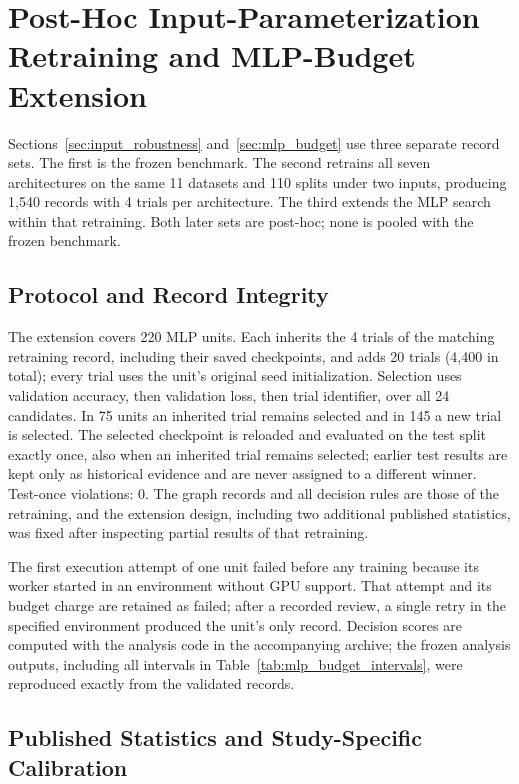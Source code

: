 \section{Post-Hoc Input-Parameterization Retraining and MLP-Budget Extension}
\label{app:mlp_budget}

Sections~\ref{sec:input_robustness} and~\ref{sec:mlp_budget} use three separate record sets. The first is the frozen benchmark. The second retrains all seven architectures on the same 11 datasets and 110 splits under two inputs, producing 1,540 records with 4 trials per architecture. The third extends the MLP search within that retraining. Both later sets are post-hoc; none is pooled with the frozen benchmark.

\subsection{Protocol and Record Integrity}

The extension covers 220 MLP units. Each inherits the 4 trials of the matching retraining record, including their saved checkpoints, and adds 20 trials (4,400 in total); every trial uses the unit's original seed initialization. Selection uses validation accuracy, then validation loss, then trial identifier, over all 24 candidates. In 75 units an inherited trial remains selected and in 145 a new trial is selected. The selected checkpoint is reloaded and evaluated on the test split exactly once, also when an inherited trial remains selected; earlier test results are kept only as historical evidence and are never assigned to a different winner. Test-once violations: 0. The graph records and all decision rules are those of the retraining, and the extension design, including two additional published statistics, was fixed after inspecting partial results of that retraining.

The first execution attempt of one unit failed before any training because its worker started in an environment without GPU support. That attempt and its budget charge are retained as failed; after a recorded review, a single retry in the specified environment produced the unit's only record. Decision scores are computed with the analysis code in the accompanying archive; the frozen analysis outputs, including all intervals in Table~\ref{tab:mlp_budget_intervals}, were reproduced exactly from the validated records.

\subsection{Published Statistics and Study-Specific Calibration}

